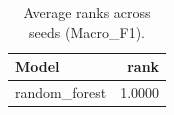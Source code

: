 \begin{table}[t]
\centering
\begin{tabular}{lr}
\toprule
Model & rank \\
\midrule
random_forest & 1.0000 \\
\bottomrule
\end{tabular}
\caption{Average ranks across seeds (Macro_F1).}
\label{tab:avg_rank_Macro_F1}
\end{table}
